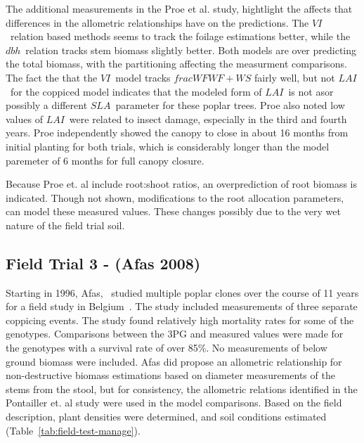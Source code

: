 \documentclass[10pt]{article}
\newcommand{\dbh}{\ensuremath{dbh}}
\newcommand{\LAI}{\ensuremath{LAI}}
\newcommand{\SLA}{\ensuremath{SLA}}
\newcommand{\VI}{\ensuremath{VI}}
\begin{document}
The additional measurements in the Proe et al. study, hightlight the affects
that differences in the allometric relationships have on the predictions.  The
\VI~relation based methods seems to track the foilage estimations better, while
the \dbh~relation tracks stem biomass slightly better.  Both models are over
predicting the total biomass, with the partitioning affecting the measurment
comparisons.  The fact the that the \VI~model tracks $frac{WF}{WF+WS}$ fairly
well, but not \LAI~for the coppiced model indicates that the modeled form of
\LAI~is not asor possibly a different \SLA~parameter for these poplar
trees. Proe also noted low values of \LAI~were related to insect damage,
especially in the third and fourth years. Proe independently showed the canopy
to close in about 16 months from initial planting for both trials, which is
considerably longer than the model paremeter of 6 months for full canopy
closure.

Because Proe et. al include root:shoot ratios, an overprediction of root biomass
is indicated.  Though not shown, modifications to the root allocation
parameters, can model these measured values.  These changes possibly due to the
very wet nature of the field trial soil.

\subsection*{Field Trial 3 - (Afas 2008)}
\label{afas2008}

Starting in 1996, Afas,~\cite{Afas2008a} studied multiple poplar clones over the
course of 11 years for a field study in Belgium~\cite{Laureysens2005,Laureysens2004}.
The study included measurements of three separate coppicing events.  The study
found relatively high mortality rates for some of the genotypes.  Comparisons
between the 3PG and measured values were made for the genotypes with a survival
rate of over 85\%.  No measurements of below ground biomass were included.  Afas
did propose an allometric relationship for non-destructive biomass estimations
based on diameter measurements of the stems from the stool, but for consistency,
the allometric relations identified in the Pontailler et. al study were used in
the model comparisons.  Based on the field description, plant densities were
determined, and soil conditions estimated (Table~\ref{tab:field-test-manage}).
\end{document}
